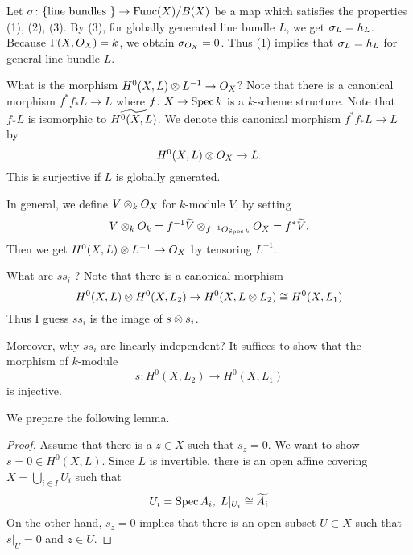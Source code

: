 \begin{rem}
  Let ${\sigma} \colon \{ \text{line bundles }\} \to \operatorname{Func}(X)/B(X)$ be a map which satisfies the properties (1), (2), (3). By (3), for globally generated line bundle $L$, we get ${\sigma}_L = h_L$. Because ${\Gamma}(X,O_X) = k$, we obtain ${\sigma}_{O_X} = 0$. Thus (1) implies that ${\sigma}_L = h_L$ for general line bundle $L$.
\end{rem}


\begin{rem}
  What is the morphism $H^0(X,L) \otimes L^{-1} \to O_X$? Note that there is a canonical morphism $f^* f_* L \to L$ where $f \colon X \to \operatorname{Spec} k$ is a $k$-scheme structure. Note that $f_* L$ is isomorphic to $\widetilde{H^0(X,L)}$. We denote this canonical morphism $f^* f_* L \to L$ by
  \[
  H^0(X,L) \otimes O_X \to L.
  \]
  This is surjective if $L$ is globally generated.

  In general, we define $V \otimes_k O_X$ for $k$-module $V$, by setting
  \[
  V \otimes_k O_k = f^{-1} \widetilde{V} \otimes_{f^{-1}O_{\operatorname{Spec} k}} O_X = f^* \widetilde{V}.
  \]
Then we get $H^0(X,L) \otimes L^{-1} \to O_X$ by tensoring $L^{-1}$.
\end{rem}


\begin{rem}
  What are $s s_i$ ? Note that there is a canonical morphism
  \[
  H^0(X,L) \otimes H^0(X,L_2) \to H^0(X,L \otimes L_2) \cong H^0(X,L_1)
  \]
  Thus I guess $s s_i$ is the image of $s \otimes s_i$.

  Moreover, why $s s_i$ are linearly independent? It suffices to show that the morphism of $k$-module
  \[
  s \colon H^0(X,L_2) \to H^0(X,L_1)
  \]
  is injective.

  We prepare the following lemma.
  \begin{proof}
    Assume that there is a $z \in X$ such that $s_z = 0$. We want to show $s = 0 \in H^0(X,L)$. Since  $L$ is invertible, there is an open affine covering $X = \bigcup_{i \in I} U_i$ such that
    \[
    U_i = \operatorname{Spec} A_i , \; L|_{U_i} \cong \widetilde{A_i}
    \]
    On the other hand, $s_z = 0$ implies that there is an open subset $U \subset X$ such that $s|_U = 0$ and $z \in U$. 
  \end{proof}
\end{rem}



